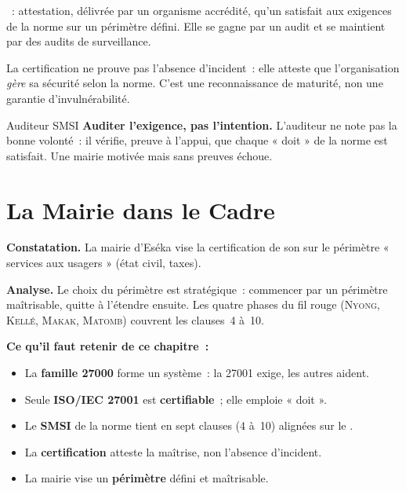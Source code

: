 \begin{boxdef}
~: attestation, délivrée par un
organisme accrédité, qu'un  satisfait aux exigences de la norme sur
un périmètre défini. Elle se gagne par un audit et se maintient par des audits
de surveillance.
\end{boxdef}

La certification ne prouve pas l'absence d'incident~: elle atteste que
l'organisation \emph{gère} sa sécurité selon la norme. C'est une reconnaissance
de maturité, non une garantie d'invulnérabilité.

\begin{boxmetier}{Auditeur SMSI}
\textbf{Auditer l'exigence, pas l'intention.} L'auditeur ne note pas la bonne
volonté~: il vérifie, preuve à l'appui, que chaque « doit » de la norme est
satisfait. Une mairie motivée mais sans preuves échoue.
\end{boxmetier}

\section{La Mairie dans le Cadre}
\label{sec:c07-mairie}

\begin{boxprocedure}
\textbf{Constatation.} La mairie d'Eséka vise la certification  de son  sur le périmètre « services aux usagers » (état
civil, taxes).

\medskip
\textbf{Analyse.} Le choix du périmètre est stratégique~: commencer par un
périmètre maîtrisable, quitte à l'étendre ensuite. Les quatre phases du fil
rouge (\textsc{Nyong}, \textsc{Kellé}, \textsc{Makak}, \textsc{Matomb})
couvrent les clauses~4 à~10.
\end{boxprocedure}

\separateur

\begin{boxresume}
\textbf{Ce qu'il faut retenir de ce chapitre~:}
\begin{itemize}
    \item La \textbf{famille 27000} forme un système~: la 27001 exige, les
          autres aident.
    \item Seule \textbf{ISO/IEC 27001} est \textbf{certifiable}~; elle emploie
          « doit ».
    \item Le \textbf{SMSI} de la norme tient en sept clauses (4 à~10) alignées
          sur le .
    \item La \textbf{certification} atteste la maîtrise, non l'absence
          d'incident.
    \item La mairie vise un \textbf{périmètre} défini et maîtrisable.
\end{itemize}
\end{boxresume}

